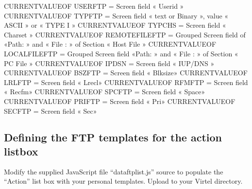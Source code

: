 \documentclass[letterpaper,10pt,english]{sphinxmanual}
\begin{document}
\begin{sphinxVerbatim}[commandchars=\\\{\}]
\PYGZob{}\PYGZob{}\PYGZob{}CURRENT\PYGZhy{}VALUE\PYGZhy{}OF \PYGZdq{}USERFTP\PYGZdq{}\PYGZcb{}\PYGZcb{}\PYGZcb{}    = Screen field « Userid »
\PYGZob{}\PYGZob{}\PYGZob{}CURRENT\PYGZhy{}VALUE\PYGZhy{}OF \PYGZdq{}TYPFTP\PYGZdq{}\PYGZcb{}\PYGZcb{}\PYGZcb{}     = Screen field « text or Binary », value « ASCII » or « TYPE I »
\PYGZob{}\PYGZob{}\PYGZob{}CURRENT\PYGZhy{}VALUE\PYGZhy{}OF \PYGZdq{}TYPCHS\PYGZdq{}\PYGZcb{}\PYGZcb{}\PYGZcb{}     = Screen field « Charset »
\PYGZob{}\PYGZob{}\PYGZob{}CURRENT\PYGZhy{}VALUE\PYGZhy{}OF \PYGZdq{}REMOTEFILEFTP\PYGZdq{}\PYGZcb{}\PYGZcb{}\PYGZcb{}      = Grouped Screen field of  «Path: » and « File : » of Section « Host File »
\PYGZob{}\PYGZob{}\PYGZob{}CURRENT\PYGZhy{}VALUE\PYGZhy{}OF \PYGZdq{}LOCALFILEFTP\PYGZdq{}\PYGZcb{}\PYGZcb{}\PYGZcb{}       = Grouped Screen field «Path: » and « File : » of Section « PC File »
\PYGZob{}\PYGZob{}\PYGZob{}CURRENT\PYGZhy{}VALUE\PYGZhy{}OF \PYGZdq{}IPDSN\PYGZdq{}\PYGZcb{}\PYGZcb{}\PYGZcb{}      = Screen field « IUP/DNS »
\PYGZob{}\PYGZob{}\PYGZob{}CURRENT\PYGZhy{}VALUE\PYGZhy{}OF \PYGZdq{}BSZFTP\PYGZdq{}\PYGZcb{}\PYGZcb{}\PYGZcb{}     = Screen field « Blksize»
\PYGZob{}\PYGZob{}\PYGZob{}CURRENT\PYGZhy{}VALUE\PYGZhy{}OF \PYGZdq{}LRLFTP\PYGZdq{}\PYGZcb{}\PYGZcb{}\PYGZcb{}     = Screen field « Lrecl»
\PYGZob{}\PYGZob{}\PYGZob{}CURRENT\PYGZhy{}VALUE\PYGZhy{}OF \PYGZdq{}RFMFTP\PYGZdq{}\PYGZcb{}\PYGZcb{}\PYGZcb{}     = Screen field « Recfm»
\PYGZob{}\PYGZob{}\PYGZob{}CURRENT\PYGZhy{}VALUE\PYGZhy{}OF \PYGZdq{}SPCFTP\PYGZdq{}\PYGZcb{}\PYGZcb{}\PYGZcb{}     = Screen field « Space»
\PYGZob{}\PYGZob{}\PYGZob{}CURRENT\PYGZhy{}VALUE\PYGZhy{}OF \PYGZdq{}PRIFTP\PYGZdq{}\PYGZcb{}\PYGZcb{}\PYGZcb{}     = Screen field « Pri»
\PYGZob{}\PYGZob{}\PYGZob{}CURRENT\PYGZhy{}VALUE\PYGZhy{}OF \PYGZdq{}SECFTP\PYGZdq{}\PYGZcb{}\PYGZcb{}\PYGZcb{}     = Screen field « Sec»
\end{sphinxVerbatim}


\subsection{Defining the FTP templates for the action listbox}
\label{\detokenize{Customization:defining-the-ftp-templates-for-the-action-listbox}}
Modify the supplied JavaScript file “dataftplist.js” source to populate the “Action” list box with your personal templates. Upload to your Virtel directory.
\end{document}
